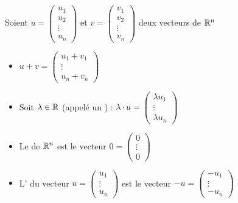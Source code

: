 \begin{frame}
\vspace*{1ex}
 Soient $u = \left(\begin{smallmatrix} u_1\\ u_2\\\vdots \\ u_n \end{smallmatrix}\right)$
  et $v =\left(\begin{smallmatrix} v_1\\ v_2\\\vdots \\ v_n \end{smallmatrix}\right)$ 
  deux vecteurs de $\mathbb{R}^n$

\pause
\begin{mydefinition}
\begin{itemize}
  \vspace*{-1ex}
  \item {}  
  $u + v = \begin{pmatrix}u_1 + v_1 \\ \vdots \\ u_n + v_n\end{pmatrix}$
\pause   
  \item {} 
  
  Soit $\lambda\in \mathbb{R}$ 
  (appelé un ) :  
$\lambda \cdot u = \begin{pmatrix}\lambda u_1 \\ \vdots \\ \lambda u_n \end{pmatrix}$
\pause  
  \item Le  de $\mathbb{R}^n$ est le vecteur 
  $0 = \left(\begin{smallmatrix} 0 \\ \vdots \\ 0 \end{smallmatrix}\right)$
\pause  
  \item L' du vecteur $u = \left(\begin{smallmatrix} u_1\\ \vdots \\ u_n \end{smallmatrix}\right)$ 
   est le vecteur 
   $-u = \left(\begin{smallmatrix} -u_1\\ \vdots \\ -u_n \end{smallmatrix}\right)$
\end{itemize}
\end{mydefinition}
\end{frame}


